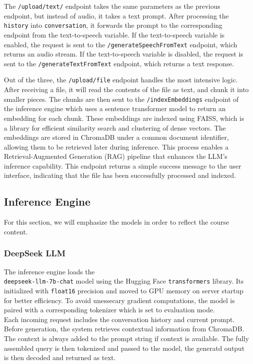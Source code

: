 \documentclass[twocolumn]{article}
\begin{document}
The \verb|/upload/text/| endpoint takes the same parameters as the previous endpoint, but instead of audio, it takes a text prompt. After processing the \verb|history| into \verb|conversation|, it forwards the prompt to the corresponding endpoint from the text-to-speech variable. If the text-to-speech variable is enabled, the request is sent to the \verb|/generateSpeechFromText| endpoint, which returns an audio stream. If the text-to-speech variable is disabled, the request is sent to the \verb|/generateTextFromText| endpoint, which returns a text response.

Out of the three, the \verb|/upload/file| endpoint handles the most intensive logic. After receiving a file, it will read the contents of the file as text, and chunk it into smaller pieces. The chunks are then sent to the \verb|/indexEmbeddings| endpoint of the inference engine which uses a sentence transformer model to return an embedding for each chunk. These embeddings are indexed using FAISS, which is a library for efficient similarity search and clustering of dense vectors. The embeddings are stored in ChromaDB\cite{chromadb2023} under a common document identifier, allowing them to be retrieved later during inference. This process enables a Retrieval-Augmented Generation (RAG) pipeline that enhances the LLM's inference capability. This endpoint returns a simple success message to the user interface, indicating that the file has been successfully processed and indexed.

\subsection{Inference Engine}
For this section, we will emphasize the models in order to reflect the course content.

\subsubsection{DeepSeek LLM}
The inference engine loads the\\\texttt{deepseek-llm-7b-chat}\cite{deepseek7bchat} model using the Hugging Face \texttt{transformers} library. Its initialized with \texttt{float16} precision and moved to GPU memory on server startup for better efficiency. To avoid unessecary gradient computations, the model is paired with a corresponding tokenizer which is set to evaluation mode.\\
Each incoming request includes the conversation history and current prompt. Before generation, the system retrieves contextual information from ChromaDB. The context is always added to the prompt string if context is available. The fully assembled query is then tokenized and passed to the model, the generatd output is then decoded and returned as text.
\end{document}
